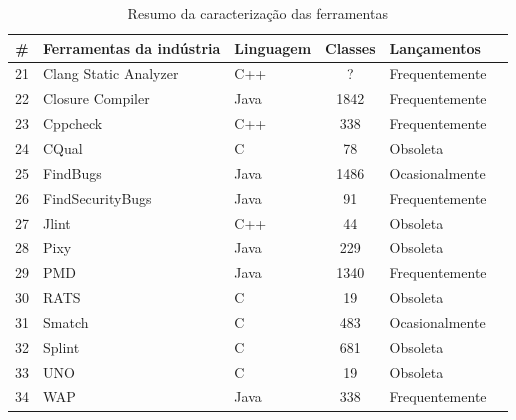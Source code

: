 \begin{table}[H]
  \caption{Resumo da caracterização das ferramentas}
  \centering
  \begin{tabular}{| c | l | l | c | l | l |}
    \hline
    \# & Ferramentas da indústria & Linguagem & Classes & Lançamentos \\
    \hline
    21 & Clang Static Analyzer    & C++   & ?     & Frequentemente \\
    22 & Closure Compiler         & Java  & 1842  & Frequentemente \\
    23 & Cppcheck                 & C++   & 338   & Frequentemente \\
    24 & CQual                    & C     & 78    & Obsoleta       \\
    25 & FindBugs                 & Java  & 1486  & Ocasionalmente \\
    26 & FindSecurityBugs         & Java  & 91    & Frequentemente \\
    27 & Jlint                    & C++   & 44    & Obsoleta       \\
    28 & Pixy                     & Java  & 229   & Obsoleta       \\
    29 & PMD                      & Java  & 1340  & Frequentemente \\
    30 & RATS                     & C     & 19    & Obsoleta       \\
    31 & Smatch                   & C     & 483   & Ocasionalmente \\
    32 & Splint                   & C     & 681   & Obsoleta       \\
    33 & UNO                      & C     & 19    & Obsoleta       \\
    34 & WAP                      & Java  & 338   & Frequentemente \\
    \hline
  \end{tabular}
  \label{total-de-ferramentas}
\end{table}


%
%

